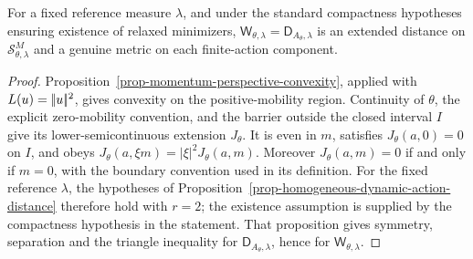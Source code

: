 \begin{prop}\label{prop-concave-mobility-distance}
For a fixed reference measure \(\lambda\), and under the standard compactness hypotheses ensuring existence of relaxed minimizers, \(\mathsf W_{\theta,\lambda}=\mathsf D_{A_\theta,\lambda}\) is an extended distance on $\mathcal S_{\theta,\lambda}^M$ and a genuine metric on each finite-action component.
\end{prop}
\begin{proof}
Proposition~\ref{prop-momentum-perspective-convexity}, applied with \(L(u)=|\!| u |\!|^2\), gives convexity on the positive-mobility region. Continuity of $\theta$, the explicit zero-mobility convention, and the barrier outside the closed interval $I$ give its lower-semicontinuous extension $J_\theta$. It is even in \(m\), satisfies \(J_\theta(a,0)=0\) on $I$, and obeys
\(J_\theta(a,\xi m)=|\xi|^2J_\theta(a,m)\).
Moreover \(J_\theta(a,m)=0\) if and only if \(m=0\), with the boundary convention used in its definition. For the fixed reference \(\lambda\), the hypotheses of Proposition~\ref{prop-homogeneous-dynamic-action-distance} therefore hold with \(r=2\); the existence assumption is supplied by the compactness hypothesis in the statement. That proposition gives symmetry, separation and the triangle inequality for \(\mathsf D_{A_\theta,\lambda}\), hence for \(\mathsf W_{\theta,\lambda}\).
\end{proof}
